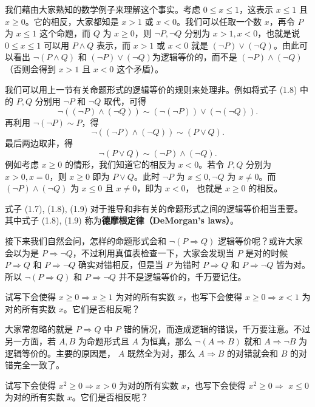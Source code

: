 我们藉由大家熟知的数学例子来理解这个事实。考虑 \(0 \le x \le 1\)，这表示 \(x \le 1\) 且 \(x \ge 0\)。它的相反，大家都知是 \(x > 1\) 或 \(x < 0\)。我们可以任取一个数 \(x\)，再令 \(P\) 为 \(x \le 1\) 这个命题，而 \(Q\) 为 \(x \ge 0\)，则 \(\neg P, \neg Q\) 分别为 \(x > 1, x < 0\)，也就是说 \(0 \le x \le 1\) 可以用 \(P \land Q\) 表示，而 \(x > 1\) 或 \(x < 0\) 就是 \((\neg P) \lor (\neg Q)\)。由此可以看出 \(\neg (P \land Q)\) 和 \((\neg P) \lor (\neg Q)\)为逻辑等价的，而不是 \((\neg P) \land (\neg Q)\) （否则会得到 \(x > 1\) 且 \(x < 0\) 这个矛盾）。

我们可以用上一节有关命题形式的逻辑等价的规则来处理非。例如将式子 (1.8) 中的 \(P, Q\) 分别用 \(\neg P\) 和 \(\neg Q\) 取代，可得
\[
\neg((\neg P)\land (\neg Q))\sim (\neg (\neg P))\lor (\neg (\neg Q)).
\]
再利用 \(\neg (\neg P)\sim P\)，得
\[
\neg((\neg P)\land (\neg Q))\sim (P\lor Q).
\]
最后两边取非，得
\[
\neg(P\lor Q)\sim (\neg P)\land (\neg Q). \tag{1.9}
\]
例如考虑 \(x\ge 0\) 的情形，我们知道它的相反为 \(x< 0\)。若令 \(P,Q\) 分别为 \(x > 0,x = 0\)，则 \(x\ge 0\) 即为 \(P\lor Q\)。此时 \(\neg P\) 为 \(x\le 0,\neg Q\) 为 \(x\neq 0\)。而 \((\neg P)\land (\neg Q)\) 为 \(x\le 0\) 且 \(x\neq 0\)，即为 \(x< 0\)， 也就是 \(x\ge 0\) 的相反。

式子 (1.7), (1.8), (1.9) 对于推导和非有关的命题形式之间的逻辑等价相当重要。其中式子 (1.8), (1.9) 称为\textbf{德摩根定律（DeMorgan's laws）}。

接下来我们自然会问，怎样的命题形式会和 \(\neg (P\Rightarrow Q)\) 逻辑等价呢？或许大家会以为是 \(P\Rightarrow \neg Q\)，不过利用真值表检查一下，大家会发现当 \(P\) 是对的时候 \(P\Rightarrow Q\) 和 \(P\Rightarrow \neg Q\) 确实对错相反，但是当 \(P\) 为错时 \(P\Rightarrow Q\) 和 \(P\Rightarrow \neg Q\) 皆为对。所以 \(\neg (P\Rightarrow Q)\) 和 \(P\Rightarrow \neg Q\) 并不是逻辑等价的，千万要记住。

\begin{question}
试写下会使得 \(x\ge 0\Rightarrow x\ge 1\) 为对的所有实数 \(x\)，也写下会使得 \(x\ge 0\Rightarrow x< 1\) 为对的所有实数 \(x\)。它们是否相反呢？
\end{question}

大家常忽略的就是 \(P\Rightarrow Q\) 中 \(P\) 错的情况，而造成逻辑的错误，千万要注意。不过另一方面，若 \(A,B\) 为命题形式且 \(A\) 为恒真，那么 \(\neg (A\Rightarrow B)\) 就和 \(A\Rightarrow \neg B\) 为逻辑等价的。主要的原因是， \(A\) 既然全为对，那么 \(A\Rightarrow B\) 的对错就会和 \(B\) 的对错完全一致了。

\begin{question}
试写下会使得 \(x^{2}\ge 0\Rightarrow x > 0\) 为对的所有实数 \(x\)，也写下会使得 \(x^{2}\ge 0\Rightarrow\) \(x\le 0\) 为对的所有实数 \(x\)。它们是否相反呢？
\end{question}

